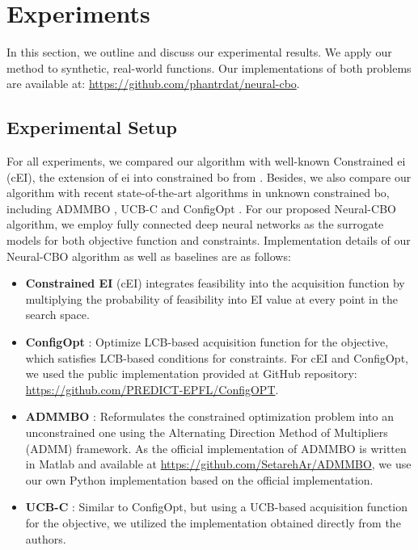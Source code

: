 \section{Experiments}
\label{section:neural-cbo_exp}
In this section, we outline and discuss our experimental results. We apply our method to synthetic, real-world functions. Our implementations of both problems are available at: \url{https://github.com/phantrdat/neural-cbo}.
\subsection{Experimental Setup}
\label{section:neural-cbo_baselines}
For all experiments, we compared our algorithm with well-known Constrained \ac{ei} (cEI), the extension of \ac{ei} into constrained \ac{bo} from \citet{gardner2014bayesian}. Besides, we also compare our algorithm with recent state-of-the-art algorithms in unknown constrained \ac{bo}, including ADMMBO \citep{ariafar2019admmbo}, UCB-C \citep{nguyen2023optimistic} and ConfigOpt \citep{xu2023constrained}. For our proposed Neural-CBO algorithm, we employ fully connected deep neural networks as the surrogate models for both objective function and constraints. Implementation details of our Neural-CBO algorithm as well as baselines are as follows:
\begin{itemize}
    \item  \textbf{Constrained EI} (cEI) \citep{gardner2014bayesian} integrates feasibility into the acquisition function by multiplying the probability of feasibility into EI value at every point in the search space.
    \item \textbf{ConfigOpt} \citep{xu2023constrained}: Optimize LCB-based acquisition function for the objective, which satisfies LCB-based conditions for constraints. For cEI and ConfigOpt, we used the public implementation provided at GitHub repository: \url{https://github.com/PREDICT-EPFL/ConfigOPT}.
    \item \textbf{ADMMBO} \citep{ariafar2019admmbo}: Reformulates the constrained optimization problem into an unconstrained one using the Alternating Direction Method of Multipliers (ADMM) framework. As the official implementation of ADMMBO is written in Matlab and available at \url{https://github.com/SetarehAr/ADMMBO}, we use our own Python implementation based on the official implementation.  
    \item \textbf{UCB-C} \citep{nguyen2023optimistic}: 
    Similar to ConfigOpt, but using a UCB-based acquisition function for the objective, we utilized the implementation obtained directly from the authors.
\end{itemize}
